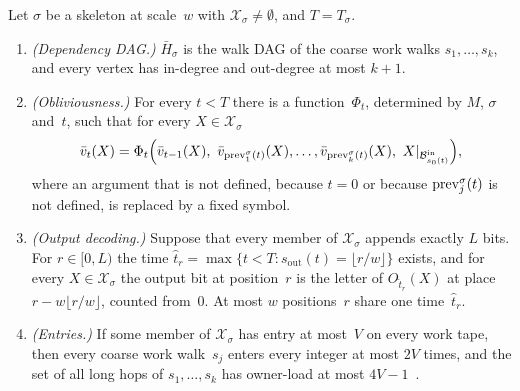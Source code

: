\begin{lemma}\label{lem:block-machine}
Let $\sigma$ be a skeleton at scale~$w$ with $\mathcal X_\sigma\ne\emptyset$, and $T=T_\sigma$.
\begin{enumerate}[label=(\alph*)]
\item \emph{(Dependency DAG.)} $\bar H_\sigma$ is the walk DAG of the coarse work walks $s_1,\dots,s_k$, and every
vertex has in-degree and out-degree at most $k+1$.
\item \emph{(Obliviousness.)} For every $t<T$ there is a function~$\Phi_t$, determined by $M$, $\sigma$ and~$t$, such
that for every $X\in\mathcal X_\sigma$
\[
  \bar v_t(X)=\Phi_t\Bigl(\bar v_{t-1}(X),\ \bar v_{\prev^\sigma_1(t)}(X),\dots,\bar v_{\prev^\sigma_k(t)}(X),\
  X|_{\mathcal B^{\mathrm{in}}_{s_0(t)}}\Bigr),
\]
where an argument that is not defined, because $t=0$ or because $\mathrm{prev}^\sigma_j(t)$ is not defined, is replaced by a
fixed symbol.
\item \emph{(Output decoding.)} Suppose that every member of $\mathcal X_\sigma$ appends exactly $L$ bits. For
$r\in[0,L)$ the time $\hat t_r=\max\{t<T:s_{\mathrm{out}}(t)=\lfloor r/w\rfloor\}$ exists, and for every
$X\in\mathcal X_\sigma$ the output bit at position~$r$ is the letter of $O_{\hat t_r}(X)$ at place
$r-w\lfloor r/w\rfloor$, counted from~$0$. At most $w$ positions~$r$ share one time~$\hat t_r$.
\item \emph{(Entries.)} If some member of $\mathcal X_\sigma$ has entry at most~$V$ on every work tape, then every
coarse work walk~$s_j$ enters every integer at most $2V$ times, and the set of all long hops of $s_1,\dots,s_k$ has
owner-load at most $4V-1$~\cite[Definition~2.2]{BoundedNesting2026}.
\end{enumerate}
\end{lemma}

